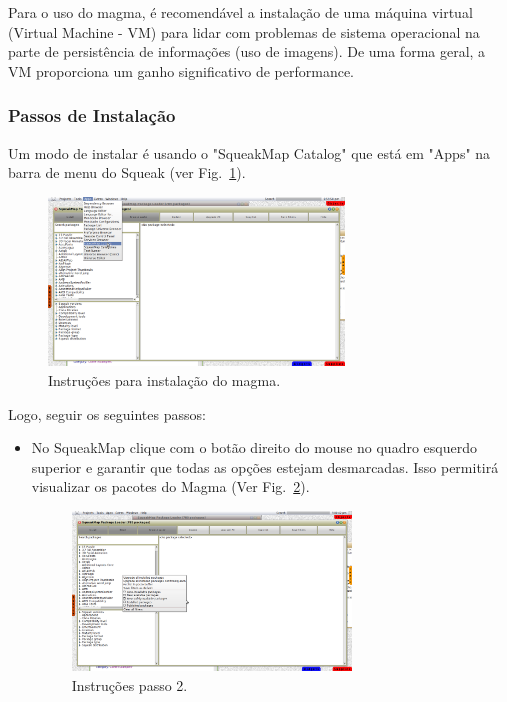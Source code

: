 \documentclass[a4paper, 10pt]{article}
\begin{document}
	Para o uso do magma, é recomendável a instalação de uma máquina virtual (Virtual Machine - VM) para lidar com problemas de sistema operacional na parte de persistência de informações (uso de imagens). De uma forma geral, a VM proporciona um ganho significativo de performance.
\begin{newpage}
\subsubsection{Passos de Instalação}

Um modo de instalar é usando o "SqueakMap Catalog" que está em "Apps" na barra de menu do Squeak (ver Fig.~\ref{fig:passo1_InstallMagma1}).

\begin{figure}[!htb]
\centering
\includegraphics[width=0.7\textwidth]{passo1_InstallMagma1.png}
\caption{Instruções para instalação do magma.}
\label{fig:passo1_InstallMagma1}
\end{figure}

Logo, seguir os seguintes passos:
\begin{itemize}
\item{No SqueakMap clique com o botão direito do mouse no quadro esquerdo superior e garantir que todas as opções estejam desmarcadas. Isso permitirá visualizar os pacotes do Magma (Ver Fig.~\ref{fig:passo2_InstallMagma2}).}

\begin{figure}[!htb]
\centering
\includegraphics[width=0.7\textwidth]{passo2_InstallMagma2.png}
\caption{Instruções passo 2.}
\label{fig:passo2_InstallMagma2}
\end{figure}



\end{itemize}
\end{newpage}
\end{document}
